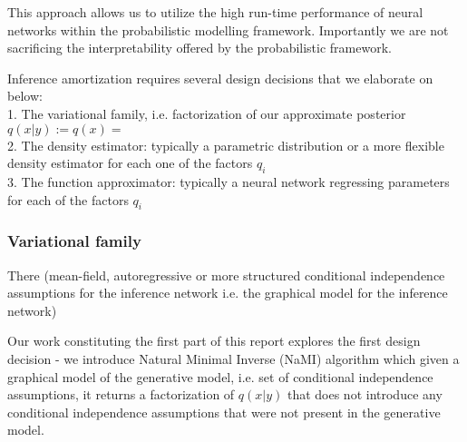 \documentclass[12pt]{article}
\begin{document}
This approach allows us to utilize the high run-time performance of neural networks within the probabilistic modelling framework. 
Importantly we are not sacrificing the interpretability offered by the probabilistic framework.

Inference amortization requires several design decisions that we elaborate on below:\\
1. The variational family, i.e. factorization of our approximate posterior $q(x|y):=q(x)=$\\
2. The density estimator: typically a parametric distribution or a more flexible density estimator for each one of the factors $q_i$\\
3. The function approximator: typically a neural network regressing parameters for each of the factors $q_i$\\


\subsubsection*{Variational family}
There (mean-field, autoregressive or more structured conditional independence assumptions for the inference network i.e. the graphical model for the inference network)

Our work constituting the first part of this report explores the first design decision -
we introduce Natural Minimal Inverse (NaMI) algorithm which given a graphical model of the generative model, 
i.e. set of conditional independence assumptions, it returns a factorization of $q(x|y)$ that
does not introduce any conditional independence assumptions that were not present in the
generative model.
\end{document}
